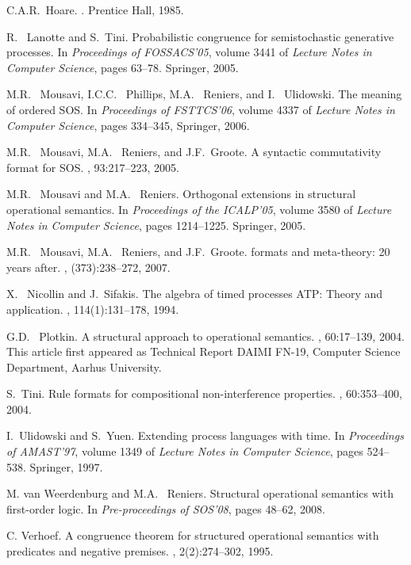 \documentclass{llncs}
\begin{document}
\begin{thebibliography}{10}
C.A.R.~Hoare.
.
\newblock Prentice Hall, 1985.

R.~ Lanotte and S.~Tini.
\newblock Probabilistic congruence for semistochastic generative processes.
\newblock In {\em Proceedings of FOSSACS'05}, volume 3441 of {\em Lecture Notes in Computer
  Science}, pages 63--78. Springer, 2005.

M.R.~ Mousavi, I.C.C.~ Phillips, M.A.~ Reniers, and I.~
  Ulidowski.
\newblock The meaning of ordered {SOS}.
\newblock In {\em Proceedings of FSTTCS'06}, volume 4337 of {\em Lecture Notes in Computer Science},
  pages 334--345, Springer, 2006.

M.R.~ Mousavi, M.A.~ Reniers, and J.F.~Groote.
\newblock A syntactic commutativity format for {SOS}.
, 93:217--223, 2005.

M.R.~ Mousavi and M.A.~ Reniers.
\newblock Orthogonal extensions in structural operational semantics.
\newblock In {\em Proceedings of the ICALP'05}, volume 3580 of {\em Lecture Notes in
  Computer Science}, pages 1214--1225. Springer, 2005.

M.R.~ Mousavi, M.A.~ Reniers, and J.F.~Groote.
 formats and meta-theory: 20 years after.
, (373):238--272, 2007.

X.~ Nicollin and J.~Sifakis.
\newblock The algebra of timed processes {ATP}: Theory and application.
, 114(1):131--178,  1994.

G.D.~ Plotkin.
\newblock A structural approach to operational semantics.
, 60:17--139,
  2004.
\newblock This article first appeared as Technical Report DAIMI FN-19, Computer Science Department, Aarhus
  University.

S.~Tini.
\newblock Rule formats for compositional non-interference properties.
, 60:353--400,
  2004.

I.~Ulidowski and S.~Yuen.
\newblock Extending process languages with time.
\newblock In {\em Proceedings of {AMAST}'97},
  volume 1349 of {\em Lecture Notes in Computer Science}, pages 524--538.
  Springer, 1997.

M. van Weerdenburg and M.A.~ Reniers.
\newblock Structural operational semantics with first-order logic.
\newblock In  {\em Pre-proceedings of SOS'08}, pages 48--62, 2008.

C. Verhoef.
\newblock A congruence theorem for structured operational semantics with
  predicates and negative premises.
, 2(2):274--302, 1995.

\end{thebibliography}


%
\end{document}
